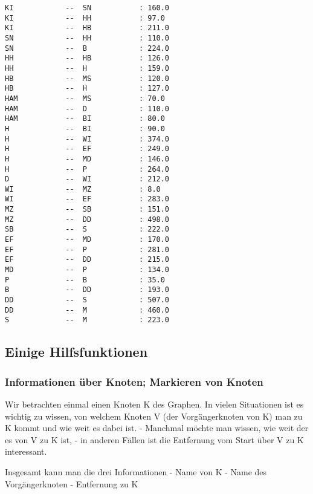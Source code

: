 \documentclass[11pt]{article}
\begin{document}
    \begin{Verbatim}[commandchars=\\\{\}]
KI            --  SN           : 160.0
KI            --  HH           : 97.0
KI            --  HB           : 211.0
SN            --  HH           : 110.0
SN            --  B            : 224.0
HH            --  HB           : 126.0
HH            --  H            : 159.0
HB            --  MS           : 120.0
HB            --  H            : 127.0
HAM           --  MS           : 70.0
HAM           --  D            : 110.0
HAM           --  BI           : 80.0
H             --  BI           : 90.0
H             --  WI           : 374.0
H             --  EF           : 249.0
H             --  MD           : 146.0
H             --  P            : 264.0
D             --  WI           : 212.0
WI            --  MZ           : 8.0
WI            --  EF           : 283.0
MZ            --  SB           : 151.0
MZ            --  DD           : 498.0
SB            --  S            : 222.0
EF            --  MD           : 170.0
EF            --  P            : 281.0
EF            --  DD           : 215.0
MD            --  P            : 134.0
P             --  B            : 35.0
B             --  DD           : 193.0
DD            --  S            : 507.0
DD            --  M            : 460.0
S             --  M            : 223.0
    \end{Verbatim}

    \hypertarget{einige-hilfsfunktionen}{%
\subsection{Einige Hilfsfunktionen}\label{einige-hilfsfunktionen}}

    \hypertarget{informationen-uxfcber-knoten-markieren-von-knoten}{%
\subsubsection{Informationen über Knoten; Markieren von
Knoten}\label{informationen-uxfcber-knoten-markieren-von-knoten}}

    Wir betrachten einmal einen Knoten K des Graphen. In vielen Situationen
ist es wichtig zu wissen, von welchem Knoten V (der Vorgängerknoten von
K) man zu K kommt und wie weit es dabei ist. - Manchmal möchte man
wissen, wie weit der es von V zu K ist, - in anderen Fällen ist die
Entfernung vom Start über V zu K interessant.

Insgesamt kann man die drei Informationen - Name von K - Name des
Vorgängerknoten - Entfernung zu K
\end{document}
